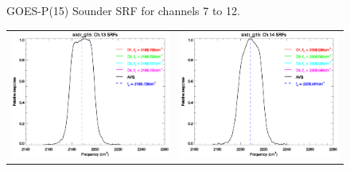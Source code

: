 \begin{figure}[htp]
\begin{tabular}{c c}
  \end{tabular}
  \caption{GOES-P(15) Sounder SRF for channels 7 to 12.}
  \label{fig:sndr_g15.ch7-12}
\end{figure}

\begin{figure}[htp]
  \centering
  \begin{tabular}{c c}
    \includegraphics[scale=0.5]{graphics/nominal/sndr_g15.ch13.srf.eps} &
    \includegraphics[scale=0.5]{graphics/nominal/sndr_g15.ch14.srf.eps} \\

\end{tabular}
\end{figure}
